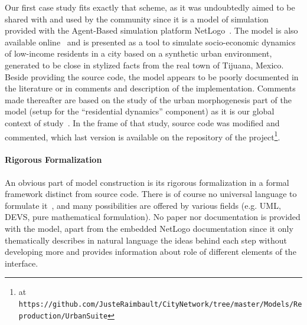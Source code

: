 Our first case study fits exactly that scheme, as it was undoubtedly aimed to be shared with and used by the community since it is a model of simulation provided with the Agent-Based simulation platform NetLogo~\cite{wilensky1999netlogo}. The model is also available online~\cite{de2007netlogo} and is presented as a tool to simulate socio-economic dynamics of low-income residents in a city based on a synthetic urban environment, generated to be close in stylized facts from the real town of Tijuana, Mexico. Beside providing the source code, the model appears to be poorly documented in the literature or in comments and description of the implementation. Comments made thereafter are based on the study of the urban morphogenesis part of the model (setup for the ``residential dynamics'' component) as it is our global context of study~\cite{raimbault2014vers}. In the frame of that study, source code was modified and commented, which last version is available on the repository of the project\footnote{at \texttt{https://github.com/JusteRaimbault/CityNetwork/tree/master/Models/Reproduction/UrbanSuite}}.




\paragraph{Rigorous Formalization}

An obvious part of model construction is its rigorous formalization in a formal framework distinct from source code. There is of course no universal language to formulate it~\cite{banos2013pour}, and many possibilities are offered by various fields (e.g. UML, DEVS, pure mathematical formulation). No paper nor documentation is provided with the model, apart from the embedded NetLogo documentation since it only thematically describes in natural language the ideas behind each step without developing more and provides information about role of different elements of the interface.

